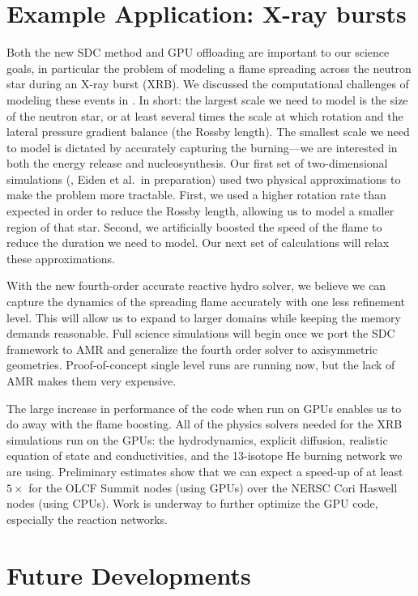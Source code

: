 \documentclass[a4paper]{jpconf}
\begin{document}
\section{Example Application: X-ray bursts}

Both the new SDC method and GPU offloading are important to our
science goals, in particular the problem of modeling a flame spreading
across the neutron star during an X-ray burst (XRB).  We discussed the
computational challenges of modeling these events in
\cite{astronum:2018}.  In short: the largest scale we need to model is
the size of the neutron star, or at least several times the scale at
which rotation and the lateral pressure gradient balance (the Rossby
length).  The smallest scale we need to model is dictated by
accurately capturing the burning---we are interested in both the
energy release and nucleosynthesis.  Our first set of two-dimensional simulations
(\cite{astronum:2018}, Eiden et al.\ in preparation) used two physical approximations to
make the problem more tractable.  First, we used a higher rotation
rate than expected in order to reduce the Rossby length, allowing us
to model a smaller region of that star.  Second, we artificially
boosted the speed of the flame to reduce the duration we need to
model.  Our next set of calculations will relax these approximations.

With the new fourth-order accurate reactive hydro solver, we believe
we can capture the dynamics of the spreading flame accurately with one
less refinement level.  This will allow us to expand to larger domains
while keeping the memory demands reasonable.  Full science simulations
will begin once we port the SDC framework to AMR and generalize the
fourth order solver to axisymmetric geometries.  Proof-of-concept single
level runs are running now, but the lack of AMR makes them very
expensive.

The large increase in performance of the code when run on GPUs enables
us to do away with the flame boosting.  All of the physics solvers
needed for the XRB simulations run on the GPUs: the hydrodynamics,
explicit diffusion, realistic equation of state and conductivities,
and the 13-isotope He burning network we are using.  Preliminary
estimates show that we can expect a speed-up of at least $5\times$ for the OLCF Summit
nodes (using GPUs) over the NERSC Cori Haswell nodes (using CPUs).
Work is underway to further optimize the GPU code,
especially the reaction networks.


\section{Future Developments}
\end{document}
